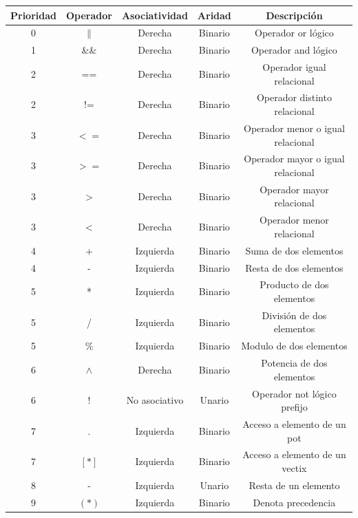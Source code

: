 \documentclass[a4paper, 10pt]{article}
\begin{document}
    \begin{table}[t]
    \begin{center}
    \begin{tabular}{| c | c | c | c | c |}
    \hline
        Prioridad & Operador & Asociatividad & Aridad & Descripción \\ \hline
        0 & $\|$ & Derecha & Binario & Operador or lógico \\ \hline
        1 & \&\& & Derecha & Binario & Operador and lógico \\ \hline
        2 & == & Derecha & Binario & Operador igual relacional \\ \hline
        2 & != & Derecha & Binario & Operador distinto relacional \\ \hline
        3 & $<=$ & Derecha & Binario & Operador menor o igual relacional \\ \hline
        3 & $>=$ & Derecha & Binario & Operador mayor o igual relacional \\ \hline
        3 & $>$ & Derecha & Binario & Operador mayor relacional \\ \hline
        3 & $<$ & Derecha & Binario & Operador menor relacional \\ \hline
        4 & + & Izquierda & Binario & Suma de dos elementos \\ \hline
        4 & - & Izquierda & Binario & Resta de dos elementos \\ \hline
        5 & * & Izquierda & Binario & Producto de dos elementos \\ \hline
        5 & / & Izquierda & Binario & División de dos elementos \\ \hline
        5 & \% & Izquierda & Binario & Modulo de dos elementos \\ \hline
        6 & $\wedge$ & Derecha & Binario & Potencia de dos elementos \\ \hline
        6 & ! & No asociativo & Unario & Operador not lógico prefijo \\ \hline
        7 & . & Izquierda & Binario & Acceso a elemento de un pot \\ \hline
        7 & $[*]$ & Izquierda & Binario & Acceso a elemento de un vectix \\ \hline
        8 & - & Izquierda & Unario & Resta de un elemento \\ \hline
        9 & $(*)$ & Izquierda & Binario & Denota precedencia \\ \hline
        

     
    \hline
    \end{tabular}
    \end{center}
    \end{table}
\end{document}
